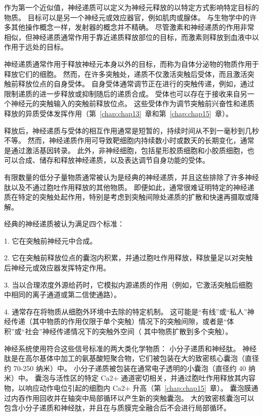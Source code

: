 作为第一个近似值，神经递质可以定义为神经元释放的以特定方式影响特定目标的物质。
目标可以是另一个神经元或效应器官，例如肌肉或腺体。 
与生物学中的许多其他操作概念一样，发射器的概念并不精确。
尽管激素和神经递质的作用非常相似，但神经递质通常作用于靠近递质释放部位的目标，而激素则释放到血液中以作用于远处的目标。


神经递质通常作用于释放神经元本身以外的目标，而称为自体分泌物的物质作用于释放它们的细胞。
然而，在许多突触处，递质不仅激活突触后受体，而且激活突触前释放位点的自身受体。
自身受体通常调节正在进行的突触传递，例如，通过限制递质的进一步释放或抑制随后的递质合成。
受体也可以存在于接收来自另一个神经元的突触输入的突触前释放位点。
这些受体作为调节突触前兴奋性和递质释放的异质受体发挥作用（第~\ref{chap:chap13}~章和第~\ref{chap:chap15}~章）。


释放后，神经递质与受体的相互作用通常是短暂的，持续时间从不到一毫秒到几秒不等。
然而，神经递质作用可导致靶细胞内持续数小时或数天的长期变化，通常是通过激活基因转录。
此外，非神经细胞，包括星形胶质细胞和小胶质细胞，也可以合成、储存和释放神经递质，以及表达调节自身功能的受体。


有限数量的低分子量物质通常被认为是经典的神经递质，并且这些排除了许多神经肽以及不通过胞吐作用释放的其他物质。
即便如此，通常很难证明特定的神经递质在特定的突触处起作用，特别是考虑到突触间隙处递质的扩散和快速再摄取或降解。


经典的神经递质被认为满足四个标准：

1. 它在突触前神经元中合成。

2. 它在突触前释放位点的囊泡内积累，并通过胞吐作用释放，释放量足以对突触后神经元或效应器发挥特定作用。

3. 当以合理浓度外源给药时，它模拟内源递质的作用（例如，它激活突触后细胞中相同的离子通道或第二信使通路）。

4. 通常存在将物质从细胞外环境中去除的特定机制。 这可能是“有线”或“私人”神经传递（其中物质的作用仅限于单个突触）情况下的突触间隙，或者是“体积”或“社会”神经传递情况下的突触外空间（ 其中物质扩散到多个突触）。


神经系统使用符合这些信号标准的两大类化学物质：
小分子递质和神经肽。
神经肽是在高尔基体中加工的氨基酸短聚合物，它们被包装在大的致密核心囊泡（直径约 70-250 纳米）中。
小分子递质被包装在通常电子透明的小囊泡（直径约 40 纳米）中。
囊泡与活性区的特定 Ca2+ 通道密切相关，并通过胞吐作用释放其内容物，以响应动作电位引起的细胞内 Ca2+ 升高（第~\ref{chap:chap15}~章）。
囊泡膜通过内吞作用回收并在轴突中局部循环以产生新的突触囊泡。
大的致密核囊泡可以包含小分子递质和神经肽，并且在与质膜完全融合后不会进行局部循环。



